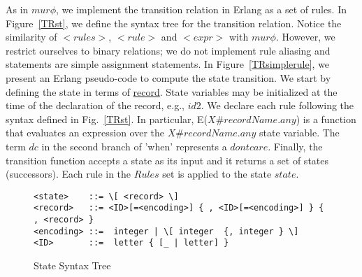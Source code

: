 As in  $mur\phi$, we implement the transition relation in Erlang as a set of rules.
In Figure~\ref{TRst}, we define the syntax tree for the transition relation. 
Notice the similarity of $<rules>$, $<rule>$ and $<expr>$ with $mur\phi$.  However,
we restrict ourselves to binary relations; we do not implement rule aliasing and statements
are simple assignment statements.
In Figure~\ref{TRsimplerule}, we present an Erlang pseudo-code to compute the state transition.
We start by defining the state in terms of \underline{record}. State variables may be
initialized at the time of the declaration of the record, e.g., $id2$. We declare each rule
following the syntax defined in Fig.~\ref{TRst}. In particular, E($X\#recordName.any$) is 
a function that evaluates an expression over the $X\#recordName.any$ state variable.
The term $dc$ in the second branch of 'when' represents a $dontcare$. Finally, the transition
function accepts a state as its input and it returns a set of states (successors). Each rule 
in the $Rules$ set is applied to the state $state$.
\begin{figure}
\begin{verbatim} 
<state>    ::= \[ <record> \]
<record>   ::= <ID>[=<encoding>] { , <ID>[=<encoding>] } { , <record> }
<encoding> ::=  integer | \[ integer  {, integer } \] 
<ID>       ::=  letter { [_ | letter] }

\end{verbatim}
\caption{State Syntax Tree}
\label{fig:Sst}
\end{figure}


